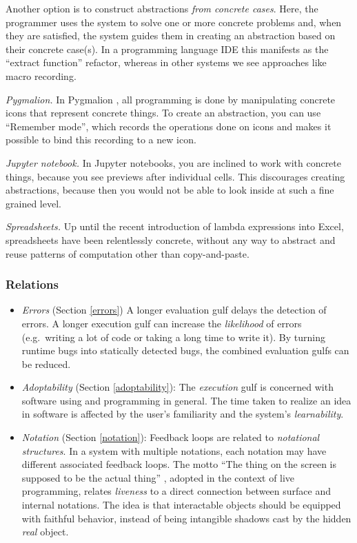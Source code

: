 \documentclass[english,submission]{programming}
\begin{document}
Another option is to construct abstractions \emph{from concrete cases}.
Here, the programmer uses the system to solve one or more concrete
problems and, when they are satisfied, the system guides them in
creating an abstraction based on their concrete case(s). In a
programming language IDE this manifests as the ``extract function''
refactor, whereas in other systems we see approaches like macro
recording.

\emph{Pygmalion.} In Pygmalion \cite{Pygmalion}, all programming is done
by manipulating concrete icons that represent concrete things. To create
an abstraction, you can use ``Remember mode'', which records the
operations done on icons and makes it possible to bind this recording to
a new icon.

\emph{Jupyter notebook.} In Jupyter notebooks, you are inclined to work
with concrete things, because you see previews after individual cells.
This discourages creating abstractions, because then you would not be
able to look inside at such a fine grained level.

\emph{Spreadsheets.} Up until the recent introduction of lambda
expressions into Excel, spreadsheets have been relentlessly concrete,
without any way to abstract and reuse patterns of computation other than
copy-and-paste.

\hypertarget{relations}{%
\subsubsection{Relations}\label{relations}}

\begin{itemize}
\tightlist
\item
  \emph{Errors} (Section \ref{errors}) A longer evaluation gulf delays
  the detection of errors. A longer execution gulf can increase the
  \emph{likelihood} of errors (e.g.~writing a lot of code or taking a
  long time to write it). By turning runtime bugs into statically
  detected bugs, the combined evaluation gulfs can be reduced.
\item
  \emph{Adoptability} (Section \ref{adoptability}): The \emph{execution}
  gulf is concerned with software using and programming in general. The
  time taken to realize an idea in software is affected by the user's
  familiarity and the system's \emph{learnability}.
\item
  \emph{Notation} (Section \ref{notation}): Feedback loops are related
  to \emph{notational structures}. In a system with multiple notations,
  each notation may have different associated feedback loops. The motto
  ``The thing on the screen is supposed to be the actual thing''
  \cite{NakedObjects}, adopted in the context of live programming,
  relates \emph{liveness} to a direct connection between surface and
  internal notations. The idea is that interactable objects should be
  equipped with faithful behavior, instead of being intangible shadows
  cast by the hidden \emph{real} object.
\end{itemize}
\end{document}

